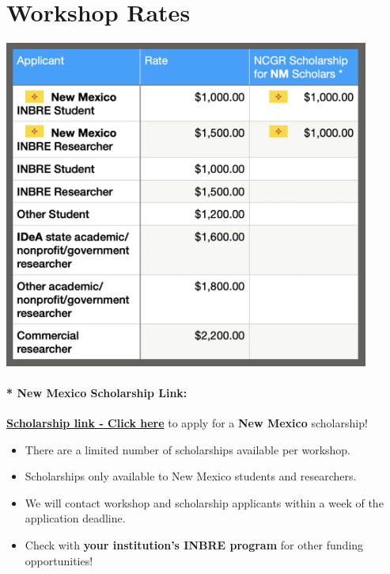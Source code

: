 \documentclass[
]{book}
\providecommand{\tightlist}{%
  \setlength{\itemsep}{0pt}\setlength{\parskip}{0pt}}
\begin{document}
\hypertarget{workshop-rates}{%
\chapter*{Workshop Rates}\label{workshop-rates}}

\includegraphics[width=0.9\textwidth,height=\textheight]{./Figures/WorkshopRates.png}

\hypertarget{new-mexico-scholarship-link}{%
\subsubsection*{* New Mexico Scholarship Link:}\label{new-mexico-scholarship-link}}

\href{https://forms.gle/MkgHEQGCBMkcVYBX8}{\textbf{Scholarship link - Click here}} to apply for a \textbf{New Mexico} scholarship!

\begin{itemize}
\tightlist
\item
  There are a limited number of scholarships available per workshop.
\item
  Scholarships only available to New Mexico students and researchers.
\item
  We will contact workshop and scholarship applicants within a week of the application deadline.
\item
  Check with \textbf{your institution's INBRE program} for other funding opportunities!
\end{itemize}
\end{document}

